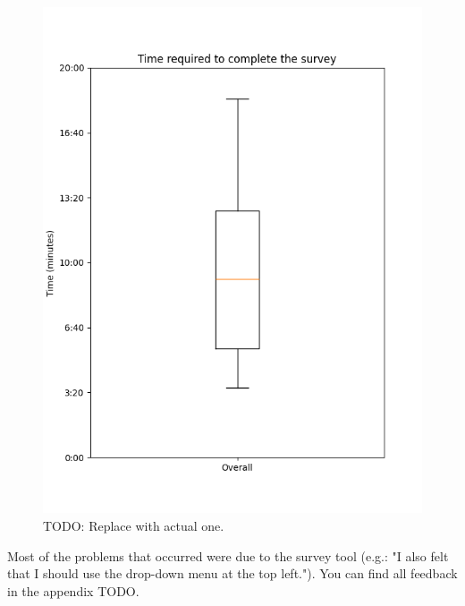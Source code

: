 \documentclass[%
class=scrreprt,
chapterprefix=false,%
open=right,%
twoside=false,%
paper=a4,%
logofile={Logo\_zentral\_farbig\_EN.png},%
thesistype=master,%
UKenglish,%
]{se2thesis}
\theoremstyle{definition}
\begin{document}
	\begin{figure}[t]
		\centering
		\includegraphics[width=\textwidth]{img/survey_time_box.png}
		\caption{TODO: Replace with actual one.}
		\label{fig:pilot_survey_time_box.png}
	\end{figure}
	
	Most of the problems that occurred were due to the survey tool (e.g.: "I also felt that I should use the drop-down menu at the top left."). You can find all feedback in the appendix TODO.
	
\end{document}
